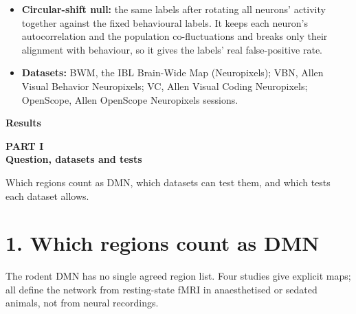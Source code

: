 \documentclass[10pt,a4paper]{article}
\begin{document}
\begin{tcolorbox}[breakable,colback=accent!8,colframe=accent,boxrule=0pt,leftrule=2pt,arc=0pt,fontupper=\small]
\begin{itemize}
\item \textbf{Circular-shift null:} the same labels after rotating all neurons' activity together against the fixed behavioural labels. It keeps each neuron's autocorrelation and the population co-fluctuations and breaks only their alignment with behaviour, so it gives the labels' real false-positive rate.
\item \textbf{Datasets:} BWM, the IBL Brain-Wide Map (Neuropixels); VBN, Allen Visual Behavior Neuropixels; VC, Allen Visual Coding Neuropixels; OpenScope, Allen OpenScope Neuropixels sessions.
\end{itemize}
\end{tcolorbox}

\clearpage
{\LARGE\bfseries Results}\par\smallskip{\color{accent}\rule{\linewidth}{0.8pt}}\par\medskip
{\small\bfseries\color{accent} PART I}\\[2pt]
{\LARGE\bfseries Question, datasets and tests}\par\medskip

Which regions count as DMN, which datasets can test them, and which tests each dataset allows.

\section{1. Which regions count as DMN}
The rodent DMN has no single agreed region list. Four studies give explicit maps; all define the network from resting-state fMRI in anaesthetised or sedated animals, not from neural recordings.
\end{document}

